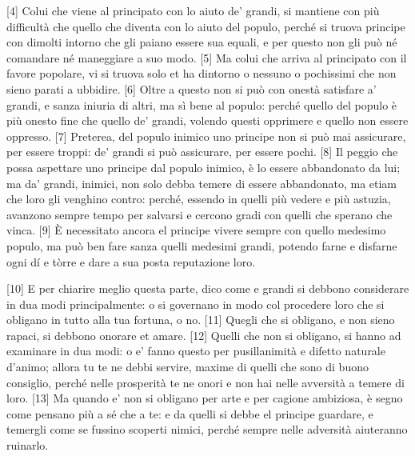 {[}4{]} Colui che viene al principato con lo aiuto de' grandi, si
mantiene con più difficultà che quello che diventa con lo aiuto del
populo, perché si truova principe con dimolti intorno che gli paiano
essere sua equali, e per questo non gli può né comandare né maneggiare a
suo modo. {[}5{]} Ma colui che arriva al principato con il favore
popolare, vi si truova solo et ha dintorno o nessuno o pochissimi che
non sieno parati a ubbidire.
{[}6{]} Oltre a questo non si può con onestà satisfare a' grandi, e
sanza iniuria di altri, ma sì bene al populo: perché quello del populo è
più onesto fine che quello de' grandi, volendo questi opprimere e quello
non essere oppresso. {[}7{]} Preterea, del populo inimico uno principe
non si può mai assicurare, per essere troppi: de' grandi si può
assicurare, per essere pochi. {[}8{]} Il peggio che possa aspettare uno
principe dal populo inimico, è lo essere abbandonato da lui; ma da'
grandi, inimici, non solo debba temere di essere abbandonato, ma etiam
che loro gli venghino contro: perché, essendo in quelli più vedere e più
astuzia, avanzono sempre tempo per salvarsi e cercono gradi con quelli
che sperano che vinca. {[}9{]} È necessitato ancora el principe vivere
sempre con quello medesimo populo, ma può ben fare sanza quelli medesimi
grandi, potendo farne e disfarne ogni dí e tòrre e dare a sua posta
reputazione loro.

{[}10{]} E per chiarire meglio questa parte, dico come e grandi si
debbono considerare in dua modi principalmente: o si governano in modo
col procedere loro che si obligano in tutto alla tua fortuna, o no.
{[}11{]} Quegli che si obligano, e non sieno rapaci, si debbono onorare
et amare. {[}12{]} Quelli che non si obligano, si hanno ad examinare in
dua modi: o e' fanno questo per pusillanimità e difetto naturale
d'animo; allora tu te ne debbi servire, maxime di quelli che sono di
buono consiglio, perché nelle prosperità te ne onori e non hai nelle
avversità a temere di loro. {[}13{]} Ma quando e' non si obligano per
arte e per cagione ambiziosa, è segno come pensano più a sé che a te: e
da quelli si debbe el principe guardare, e temergli come se fussino
scoperti nimici, perché sempre nelle adversità aiuteranno ruinarlo.

